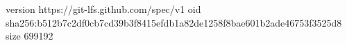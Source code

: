 version https://git-lfs.github.com/spec/v1
oid sha256:b512b7c2df0cb7cd39b3f8415efdb1a82de1258f8bae601b2ade46753f3525d8
size 699192
